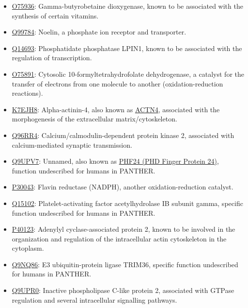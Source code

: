 \begin{itemize}
\item \href{http://www.pantherdb.org/genes/gene.do?acc=HUMAN\%7CHGNC\%3D964\%7CUniProtKB\%3DO75936}{O75936}: Gamma-butyrobetaine dioxygenase, known to be associated with the synthesis of certain vitamins.
\item \href{http://www.pantherdb.org/genes/gene.do?acc=HUMAN\%7CHGNC\%3D17187\%7CUniProtKB\%3DQ99784}{Q99784}: Noelin, a phosphate ion receptor and transporter.
\item \href{http://www.pantherdb.org/genes/gene.do?acc=HUMAN\%7CHGNC\%3D13345\%7CUniProtKB\%3DQ14693}{Q14693}: Phosphatidate phosphatase LPIN1, known to be associated with the regulation of transcription.
\item \href{http://www.pantherdb.org/genes/gene.do?acc=HUMAN\%7CHGNC\%3D3978\%7CUniProtKB\%3DO75891}{O75891}: Cytosolic 10-formyltetrahydrofolate dehydrogenase, a catalyst for the transfer of electrons from one molecule to another (oxidation-reduction reactions).
\item \href{http://www.pantherdb.org/genes/gene.do?acc=HUMAN\%7CHGNC\%3D166\%7CUniProtKB\%3DO43707}{K7EJH8}: Alpha-actinin-4, also known as \href{https://www.uniprot.org/uniprot/K7EJH8}{ACTN4}, associated with the morphogenesis of the extracellular matrix/cytoskeleton.
\item \href{http://www.pantherdb.org/genes/gene.do?acc=HUMAN\%7CHGNC\%3D1470\%7CUniProtKB\%3DQ96RR4}{Q96RR4}: Calcium/calmodulin-dependent protein kinase 2, associated with calcium-mediated synaptic transmission.
\item \href{http://www.pantherdb.org/genes/gene.do?acc=HUMAN\%7CHGNC\%3D29180\%7CUniProtKB\%3DQ9UPV7}{Q9UPV7}: Unnamed, also known as \href{https://www.uniprot.org/uniprot/Q9UPV7}{PHF24 (PHD Finger Protein 24)}, function undescribed for humans in PANTHER.
\item \href{http://www.pantherdb.org/genes/gene.do?acc=HUMAN\%7CHGNC\%3D1063\%7CUniProtKB\%3DP30043}{P30043}: Flavin reductase (NADPH), another oxidation-reduction catalyst.
\item \href{http://www.pantherdb.org/genes/gene.do?acc=HUMAN\%7CHGNC\%3D8576\%7CUniProtKB\%3DQ15102}{Q15102}: Platelet-activating factor acetylhydrolase IB subunit gamma, specific function undescribed for humans in PANTHER.
\item \href{http://www.pantherdb.org/genes/gene.do?acc=HUMAN\%7CHGNC\%3D20039\%7CUniProtKB\%3DP40123}{P40123}: Adenylyl cyclase-associated protein 2, known to be involved in the organization and regulation of the intracellular actin cytoskeleton in the cytoplasm.
\item \href{http://www.pantherdb.org/genes/gene.do?acc=HUMAN\%7CHGNC\%3D16280\%7CUniProtKB\%3DQ9NQ86}{Q9NQ86}: E3 ubiquitin-protein ligase TRIM36, specific function undescribed for humans in PANTHER.
\item \href{http://www.pantherdb.org/genes/gene.do?acc=HUMAN\%7CHGNC\%3D9064\%7CUniProtKB\%3DQ9UPR0}{Q9UPR0}:  Inactive phospholipase C-like protein 2, associated with GTPase regulation and several intracellular signalling pathways.
\end{itemize}

